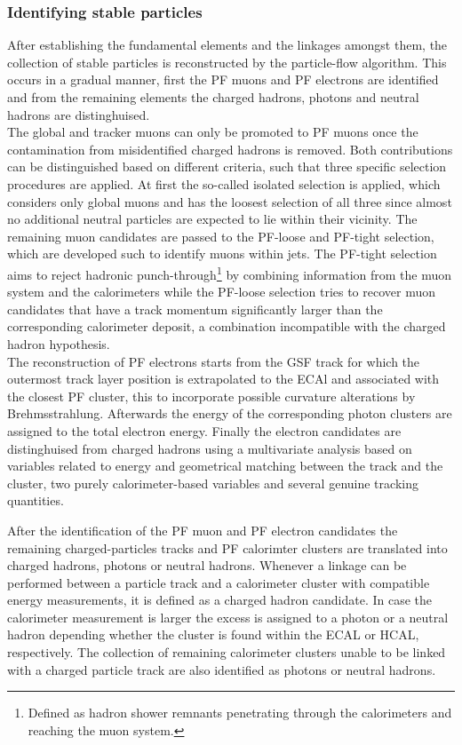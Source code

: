 \subsubsection*{Identifying stable particles}
After establishing the fundamental elements and the linkages amongst them, the collection of stable particles is reconstructed by the particle-flow algorithm. This occurs in a gradual manner, first the PF muons and PF electrons are identified and from the remaining elements the charged hadrons, photons and neutral hadrons are distinghuised.
\\
The global and tracker muons can only be promoted to PF muons once the contamination from misidentified charged hadrons is removed.
Both contributions can be distinguished based on different criteria, such that three specific selection procedures are applied.
At first the so-called isolated selection is applied, which considers only global muons and has the loosest selection of all three since almost no additional neutral particles are expected to lie within their vicinity. 
The remaining muon candidates are passed to the PF-loose and PF-tight selection, which are developed such to identify muons within jets. The PF-tight selection aims to reject hadronic punch-through\footnote{Defined as hadron shower remnants penetrating through the calorimeters and reaching the muon system.} by combining information from the muon system and the calorimeters while the PF-loose selection tries to recover muon candidates that have a track momentum significantly larger than the corresponding calorimeter deposit, a combination incompatible with the charged hadron hypothesis.
\\
The reconstruction of PF electrons starts from the GSF track for which the outermost track layer position is extrapolated to the ECAl and associated with the closest PF cluster, this to incorporate possible curvature alterations by Brehmsstrahlung.
Afterwards the energy of the corresponding photon clusters are assigned to the total electron energy. Finally the electron candidates are distinghuised from charged hadrons using a multivariate analysis based on variables related to energy and geometrical matching between the track and the cluster, two purely calorimeter-based variables and several genuine tracking quantities.

After the identification of the PF muon and PF electron candidates the remaining charged-particles tracks and PF calorimter clusters are translated into charged hadrons, photons or neutral hadrons.
Whenever a linkage can be performed between a particle track and a calorimeter cluster with compatible energy measurements, it is defined as a charged hadron candidate. In case the calorimeter measurement is larger the excess is assigned to a photon or a neutral hadron depending whether the cluster is found within the ECAL or HCAL, respectively.
The collection of remaining calorimeter clusters unable to be linked with a charged particle track are also identified as photons or neutral hadrons.

